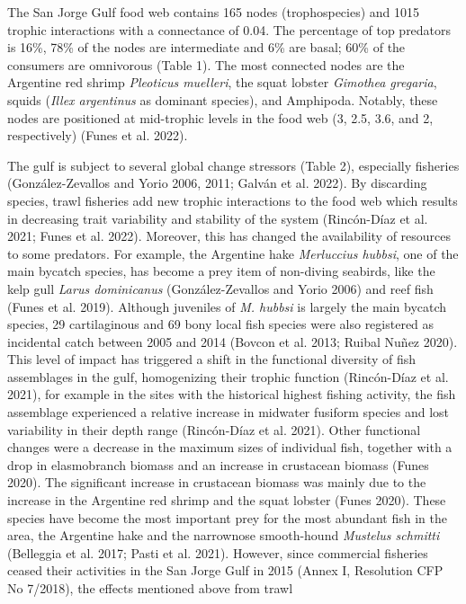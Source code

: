 \documentclass[
]{article}
\begin{document}
The San Jorge Gulf food web contains 165 nodes (trophospecies) and 1015
trophic interactions with a connectance of 0.04. The percentage of top
predators is 16\%, 78\% of the nodes are intermediate and 6\% are basal;
60\% of the consumers are omnivorous (Table 1). The most connected nodes
are the Argentine red shrimp \emph{Pleoticus muelleri}, the squat
lobster \emph{Gimothea gregaria}, squids (\emph{Illex argentinus} as
dominant species), and Amphipoda. Notably, these nodes are positioned at
mid-trophic levels in the food web (3, 2.5, 3.6, and 2, respectively)
(Funes et al. 2022).

The gulf is subject to several global change stressors (Table 2),
especially fisheries (González-Zevallos and Yorio 2006, 2011; Galván et
al. 2022). By discarding species, trawl fisheries add new trophic
interactions to the food web which results in decreasing trait
variability and stability of the system (Rincón-Díaz et al. 2021; Funes
et al. 2022). Moreover, this has changed the availability of resources
to some predators. For example, the Argentine hake \emph{Merluccius
hubbsi}, one of the main bycatch species, has become a prey item of
non-diving seabirds, like the kelp gull \emph{Larus dominicanus}
(González-Zevallos and Yorio 2006) and reef fish (Funes et al. 2019).
Although juveniles of \emph{M. hubbsi} is largely the main bycatch
species, 29 cartilaginous and 69 bony local fish species were also
registered as incidental catch between 2005 and 2014 (Bovcon et al.
2013; Ruibal Nuñez 2020). This level of impact has triggered a shift in
the functional diversity of fish assemblages in the gulf, homogenizing
their trophic function (Rincón-Díaz et al. 2021), for example in the
sites with the historical highest fishing activity, the fish assemblage
experienced a relative increase in midwater fusiform species and lost
variability in their depth range (Rincón-Díaz et al. 2021). Other
functional changes were a decrease in the maximum sizes of individual
fish, together with a drop in elasmobranch biomass and an increase in
crustacean biomass (Funes 2020). The significant increase in crustacean
biomass was mainly due to the increase in the Argentine red shrimp and
the squat lobster (Funes 2020). These species have become the most
important prey for the most abundant fish in the area, the Argentine
hake and the narrownose smooth-hound \emph{Mustelus schmitti} (Belleggia
et al. 2017; Pasti et al. 2021). However, since commercial fisheries
ceased their activities in the San Jorge Gulf in 2015 (Annex I,
Resolution CFP No 7/2018), the effects mentioned above from trawl
\end{document}
